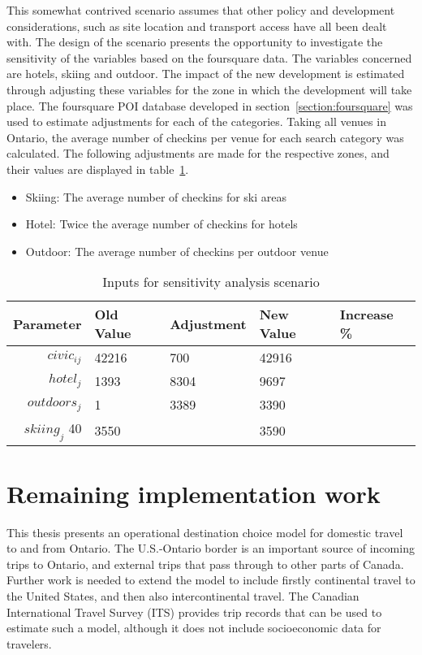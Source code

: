 This somewhat contrived scenario assumes that other policy and development considerations, such as site location and transport access have all been dealt with. The design of the scenario presents the opportunity to investigate the sensitivity of the  variables based on the foursquare data. The variables concerned are hotels, skiing and outdoor. The impact of the new development is estimated through adjusting these variables for the zone in which the development will take place. The foursquare POI database developed in section~\ref{section:foursquare} was used to estimate adjustments for each of the categories. Taking all venues in Ontario, the average number of checkins per venue for each search category was calculated. The following adjustments are made for the respective zones, and their values are displayed in table~\ref{table:scenario-inputs}.

\begin{itemize}
\item Skiing: The average number of checkins for ski areas
\item Hotel: Twice the average number of checkins for hotels
\item Outdoor: The average number of checkins per outdoor venue
\end{itemize}


\begin{table}[H]
\centering
\caption{Inputs for sensitivity analysis scenario}
\label{table:scenario-inputs}
\begin{tabular}{@{}rllll@{}}
  \toprule
 Parameter & Old Value & Adjustment & New Value & Increase \% \\ \midrule
  $civic_{ij}$ & 42216 & 700 & 42916 & \\ 
  $hotel_j$ & 1393  & 8304 & 9697 & \\ 
  $outdoors_j$  & 1 & 3389 & 3390 & \\ 
  $skiing_j$ 40  & 3550 &  & 3590 &\\ 
   \bottomrule
\end{tabular}
\end{table}





\section{Remaining implementation work}
This thesis presents an operational destination choice model for domestic travel to and from Ontario. The U.S.-Ontario border is an important source of incoming trips to Ontario, and external trips that pass through to other parts of Canada. Further work is needed to extend the model to include firstly continental travel to the United States, and then also intercontinental travel. The Canadian International Travel Survey (ITS) provides trip records that can be used to estimate such a model, although it does not include socioeconomic data for travelers. 

